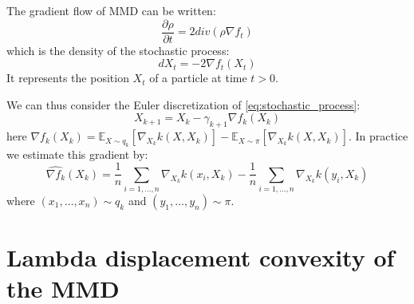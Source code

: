 \documentclass{article}
\newcommand{\1}{\mathbbm 1}
\newcommand{\E}{{{\mathbb E}}}
\theoremstyle{definition}
\begin{document}
The gradient flow of MMD can be written:
\begin{equation*}
\frac{\partial \rho}{\partial t}= 2 div(\rho  \nabla f_t)
\end{equation*}
which is the density of the stochastic process:
\begin{equation}\label{eq:stochastic_process}
dX_t=-2\nabla f_t(X_t) 
\end{equation}
It represents the position $X_t$ of a particle at time $t > 0$.


We can thus consider the Euler discretization of \eqref{eq:stochastic_process}:
\begin{equation}\label{eq:discretization}
X_{k+1}=X_k - \gamma_{k+1} \nabla f_k(X_k)
\end{equation}
here $\nabla f_k(X_k)= \E_{X \sim q_k}[\nabla_{X_k}k(X,X_k)] -  \E_{X \sim \pi}[\nabla_{X_k}k(X,X_k)]$.
In practice we estimate this gradient by:
\begin{equation*}
\widehat{\nabla f_k}(X_k)=\frac{1}{n}\sum_{i=1,\dots,n}\nabla_{X_k}k(x_i,X_k) - \frac{1}{n}\sum_{i=1,\dots,n}\nabla_{X_k}k(y_i,X_k)
\end{equation*}
where $(x_1, \dots, x_n)\sim q_k$ and $(y_1, \dots, y_n)\sim \pi$.

\section{Lambda displacement convexity of the MMD}
\end{document}
